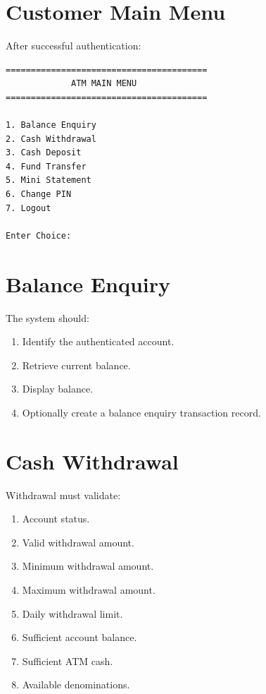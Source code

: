 \documentclass[12pt,a4paper]{article}
\begin{document}
\section{Customer Main Menu}

After successful authentication:

\begin{verbatim}
========================================
             ATM MAIN MENU
========================================

1. Balance Enquiry
2. Cash Withdrawal
3. Cash Deposit
4. Fund Transfer
5. Mini Statement
6. Change PIN
7. Logout

Enter Choice:
\end{verbatim}


\section{Balance Enquiry}

The system should:

\begin{enumerate}
    \item Identify the authenticated account.
    \item Retrieve current balance.
    \item Display balance.
    \item Optionally create a balance enquiry transaction record.
\end{enumerate}


\section{Cash Withdrawal}

Withdrawal must validate:

\begin{enumerate}
    \item Account status.
    \item Valid withdrawal amount.
    \item Minimum withdrawal amount.
    \item Maximum withdrawal amount.
    \item Daily withdrawal limit.
    \item Sufficient account balance.
    \item Sufficient ATM cash.
    \item Available denominations.
\end{enumerate}
\end{document}
